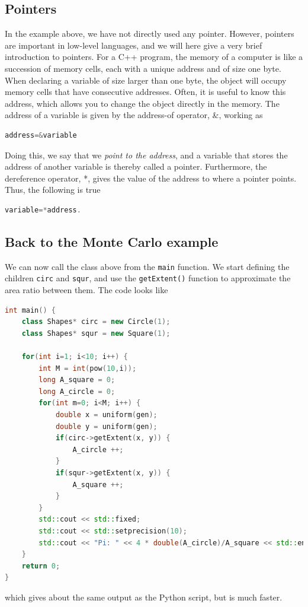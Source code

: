 \subsection{Pointers}
In the example above, we have not directly used any pointer. However, pointers are important in low-level languages, and we will here give a very brief introduction to pointers. For a C++ program, the memory of a computer is like a succession of memory cells, each with a unique address and of size one byte. When declaring a variable of size larger than one byte, the object will occupy memory cells that have consecutive addresses. Often, it is useful to know this address, which allows you to change the object directly in the memory. The address of a variable is given by the address-of operator, \&, working as
\lstset{basicstyle=\scriptsize}
\begin{lstlisting}[language=C++]
address=&variable
\end{lstlisting}
Doing this, we say that we \textit{point to the address}, and a variable that stores the address of another variable is thereby called a pointer. Furthermore, the dereference operator, *, gives the value of the address to where a pointer points. Thus, the following is true
\begin{lstlisting}[language=C++]
variable=*address.
\end{lstlisting}

\subsection{Back to the Monte Carlo example}
We can now call the class above from the \texttt{main} function. We start defining the children \texttt{circ} and \texttt{squr}, and use the \texttt{getExtent()} function to approximate the area ratio between them. The code looks like 
\begin{lstlisting}[language=c++]
int main() {   
	class Shapes* circ = new Circle(1);
	class Shapes* squr = new Square(1);

	for(int i=1; i<10; i++) {
		int M = int(pow(10,i));
		long A_square = 0;
		long A_circle = 0;
		for(int m=0; i<M; i++) {
			double x = uniform(gen);
			double y = uniform(gen);
			if(circ->getExtent(x, y)) {
				A_circle ++;
			}
			if(squr->getExtent(x, y)) {
				A_square ++;
			}
		}
		std::cout << std::fixed;
		std::cout << std::setprecision(10);
		std::cout << "Pi: " << 4 * double(A_circle)/A_square << std::endl;
	}
	return 0;
}
\end{lstlisting}
which gives about the same output as the Python script, but is much faster. 

